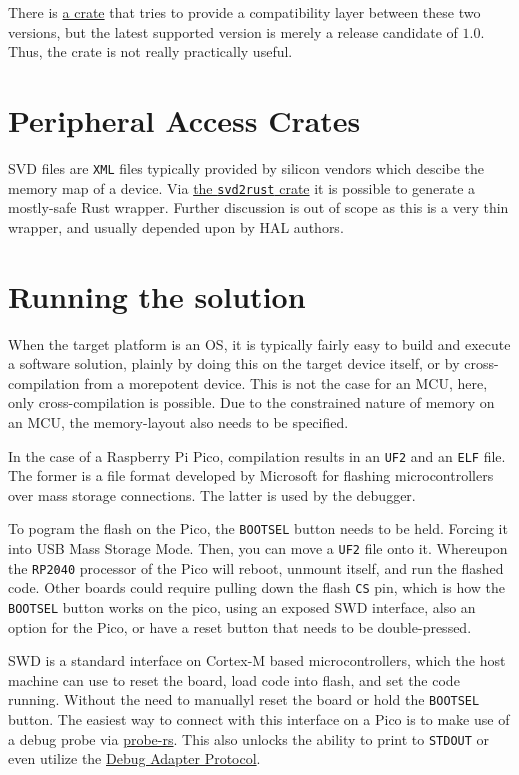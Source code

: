There is \href{https://github.com/ryankurte/embedded-hal-compat}{a crate} that tries to provide a compatibility layer between these two versions, but the latest supported version is merely a release candidate of $1.0$. Thus, the crate is not really practically useful.

\section{Peripheral Access Crates}

\gls{SVD} files are \texttt{XML} files typically provided by silicon vendors which descibe the memory map of a device. Via \href{https://crates.io/crates/svd2rust}{the \texttt{svd2rust} crate} it is possible to generate a mostly-safe Rust wrapper. Further discussion is out of scope as this is a very thin wrapper, and usually depended upon by \gls{HAL} authors.

\section{Running the solution}
\label{sec:running}

When the target platform is an \gls{OS}, it is typically fairly easy to build and execute a software solution, plainly by doing this on the target device itself, or by cross-compilation from a morepotent device. This is not the case for an \gls{MCU}, here, only cross-compilation is possible. Due to the constrained nature of memory on an \gls{MCU}, the memory-layout also needs to be specified.

In the case of a Raspberry Pi Pico, compilation results in an \texttt{UF2} and an \texttt{ELF} file. The former is a file format developed by Microsoft for flashing microcontrollers over mass storage connections. The latter is used by the debugger.

To pogram the flash on the Pico, the \texttt{BOOTSEL} button needs to be held. Forcing it into USB Mass Storage Mode. Then, you can move a \texttt{UF2} file onto it. Whereupon the \texttt{RP2040} processor of the Pico will reboot, unmount itself, and run the flashed code. Other boards could require pulling down the flash \texttt{CS} pin, which is how the \texttt{BOOTSEL} button works on the pico, using an exposed \gls{SWD} interface, also an option for the Pico, or have a reset button that needs to be double-pressed.

\gls{SWD} is a standard interface on Cortex-M based microcontrollers, which the host machine can use to reset the board, load code into flash, and set the code running. Without the need to manuallyl reset the board or hold the \texttt{BOOTSEL} button. The easiest way to connect with this interface on a Pico is to make use of a debug probe via \href{https://probe.rs/}{probe-rs}. This also unlocks the ability to print to \texttt{STDOUT} or even utilize the \href{https://microsoft.github.io/debug-adapter-protocol/overview}{Debug Adapter Protocol}.

